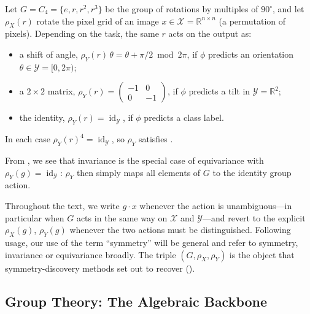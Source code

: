 \documentclass[mathematics,review,submit,moreauthors]{Definitions/mdpi}
\begin{document}
\begin{Example}
    Let $G=C_4=\{e,r,r^2,r^3\}$ be the group of rotations by multiples of $90^\circ$, and let $\rho_X(r)$ rotate the pixel grid of an image $x\in\mathcal{X}=\mathbb{R}^{n\times n}$ (a permutation of pixels).
    Depending on the task, the same $r$ acts on the output as:
    \begin{itemize}
        \item a shift of angle, $\rho_Y(r)\,\theta=\theta+\pi/2 \bmod 2\pi$, if $\phi$ predicts an orientation $\theta\in\mathcal{Y}=[0,2\pi)$;
        \item a $2\times 2$ matrix, $\rho_Y(r)=\left(\begin{smallmatrix}-1&0\\0&-1\end{smallmatrix}\right)$, if $\phi$ predicts a tilt in $\mathcal{Y}=\mathbb{R}^2$;
        \item the identity, $\rho_Y(r)=\operatorname{id}_{\mathcal{Y}}$, if $\phi$ predicts a class label.
    \end{itemize}
    In each case $\rho_Y(r)^4=\operatorname{id}_{\mathcal{Y}}$, so $\rho_Y$ satisfies .
\end{Example}

From , we see that invariance is the special case of equivariance with $\rho_Y(g)=\operatorname{id}_{\mathcal{Y}}$: $\rho_Y$ then simply maps all elements of $G$ to the identity group action.

Throughout the text, we write $g\cdot x$ whenever the action is unambiguous---in particular when $G$ acts in the same way on $\mathcal{X}$ and $\mathcal{Y}$---and revert to the explicit $\rho_X(g)$, $\rho_Y(g)$ whenever the two actions must be distinguished.
Following usage, our use of the term ``symmetry'' will be general and refer to symmetry, invariance or equivariance broadly.
The triple $(G,\rho_X,\rho_Y)$ is the object that symmetry-discovery methods set out to recover ().

\subsection{Group Theory: The Algebraic Backbone}
\label{sec:group-theory-backbone}
\end{document}
